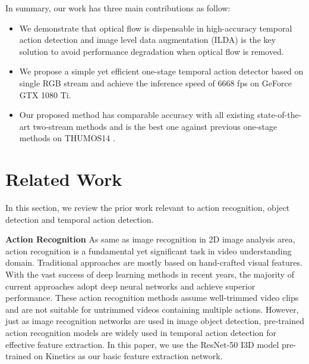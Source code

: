 \documentclass[final]{cvpr}
\begin{document}
In summary, our work has three main contributions as follow:
\begin{itemize}
\item We demonstrate that optical flow is dispensable in high-accuracy temporal action detection and image level data augmentation (ILDA) is the key solution to avoid performance degradation when optical flow is removed.
\item We propose a simple yet efficient one-stage temporal action detector based on single RGB stream and achieve the inference speed of 6668 fps on GeForce GTX 1080 Ti.
\item Our proposed method has comparable accuracy with all existing state-of-the-art two-stream methods and is the best one against previous one-stage methods on THUMOS14 \cite{jiang2014thumos}.
\end{itemize}

\section{Related Work}
In this section, we review the prior work relevant to action recognition, object detection and temporal action detection.

\textbf{Action Recognition}
As same as image recognition in 2D image analysis area, action recognition is a fundamental yet significant task in video understanding domain. Traditional approaches \cite{dalal2006human, klaser2008spatio, scovanner20073, wang2013action} are mostly based on hand-crafted visual features. With the vast success of deep learning methods in recent years, the majority of current approaches \cite{tran2015learning, wang2016temporal, carreira2017quo, tran2018closer, wang2018appearance, sun2018optical, wang2018non, jiang2019stm, lin2019tsm, kwon2020motionsqueeze} adopt deep neural networks and achieve superior performance. These action recognition methods assume well-trimmed video clips and are not suitable for untrimmed videos containing multiple actions. However, just as image recognition networks are used in image object detection, pre-trained action recognition models are widely used in temporal action detection for effective feature extraction. In this paper, we use the ResNet-50 I3D \cite{wang2018non} model pre-trained on Kinetics \cite{kay2017kinetics} as our basic feature extraction network.
\end{document}
